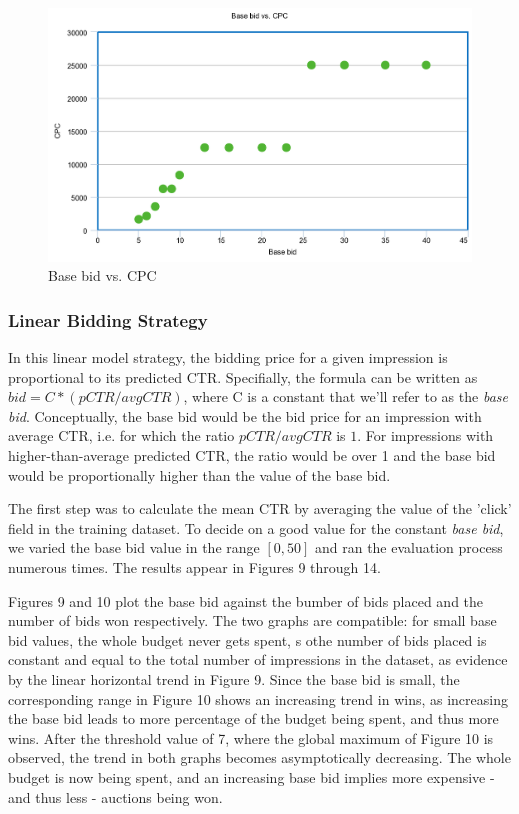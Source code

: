 \documentclass{sig-alternate-05-2015}
\begin{document}
\begin{figure}
  \includegraphics[width=\linewidth]{linear_CPC.png}
  \caption{Base bid vs. CPC}
  \label{fig:bids}
\end{figure}

\subsubsection{Linear Bidding Strategy}

In this linear model strategy, the bidding price for a given impression is proportional to its predicted CTR. Specifially, the formula can be written as $bid = C * (pCTR / avg CTR) $, where C is a constant that we'll refer to as the \textit{base bid}. Conceptually, the base bid would be the bid price for an impression with average CTR, i.e. for which the ratio $pCTR / avg CTR$ is $1$. For impressions with higher-than-average predicted CTR, the ratio would be over 1 and the base bid would be proportionally higher than the value of the base bid.

The first step was to calculate the mean CTR by averaging the value of the 'click' field in the training dataset. To decide on a good value for the constant \textit{base bid}, we varied the base bid value in the range $[0, 50]$ and ran the evaluation process numerous times. The results appear in Figures 9 through 14.

Figures 9 and 10 plot the base bid against the bumber of bids placed and the number of bids won respectively. The two graphs are compatible: for small base bid values, the whole budget never gets spent, s othe number of bids placed is constant and equal to the total number of impressions in the dataset, as evidence by the linear horizontal trend in Figure 9. Since the base bid is small, the corresponding range in Figure 10 shows an increasing trend in wins, as increasing the base bid leads to more percentage of the budget being spent, and thus more wins. After the threshold value of 7, where the global maximum of Figure 10 is observed,  the trend in both graphs becomes asymptotically decreasing. The whole budget is now being spent, and an increasing base bid implies more expensive - and thus less - auctions being won.
\end{document}
